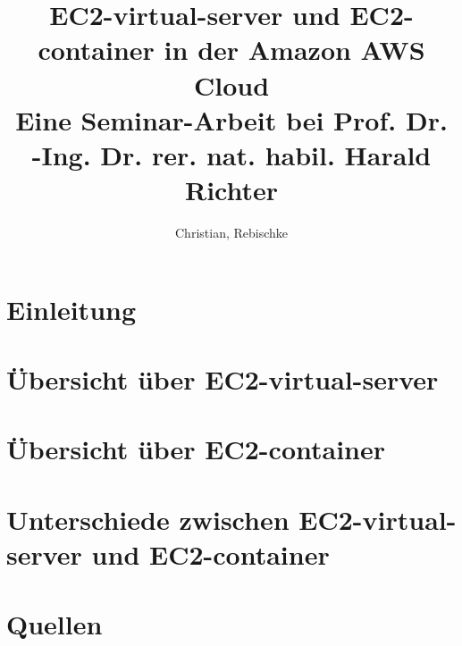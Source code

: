 \documentclass[titlepage]{article}
\title{EC2-virtual-server und EC2-container in der Amazon AWS Cloud \\
\large Eine Seminar-Arbeit bei Prof. Dr. -Ing. Dr. rer. nat. habil.
Harald Richter}
\author{Christian, Rebischke}
\begin{document}
\maketitle
\tableofcontents
\newpage
\section{Einleitung}
\newpage
\section{Übersicht über EC2-virtual-server}
\newpage
\section{Übersicht über EC2-container}
\newpage
\section{Unterschiede zwischen EC2-virtual-server und EC2-container}
\newpage
\section{Quellen}
\nocite{*}


\listoffigures
\end{document}
